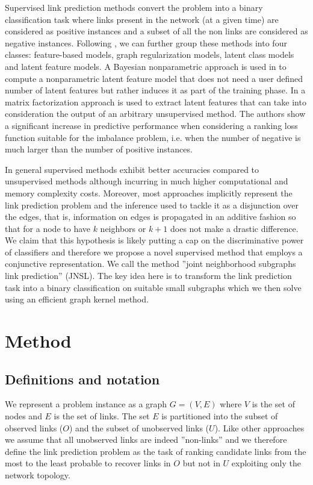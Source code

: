 \documentclass[runningheads,a4paper]{llncs}
\begin{document}
Supervised link prediction methods convert the problem into a binary classification task where links present in the network (at a given time) are considered as positive instances and a subset of all the non links are considered as negative instances. Following \cite{matrix-factorization}, we can further group these methods into four classes: feature-based models, graph regularization models, latent class models and latent feature models. 
A Bayesian nonparametric approach is used in \cite{nonparametric} to compute a nonparametric latent feature model that does not need a user defined number of latent features but rather induces it as part of the training phase. 
In \cite{matrix-factorization} a matrix factorization approach is used to extract latent features that can take into consideration the output of an arbitrary unsupervised method. The authors show a significant increase in predictive performance when considering a ranking loss function suitable for  the imbalance problem, i.e. when the number of negative is much larger than the number of positive instances. 

In general supervised methods exhibit better accuracies compared to unsupervised methods although incurring in much higher computational and memory complexity costs.
Moreover, most approaches implicitly represent the link prediction problem and the inference used to tackle it as a disjunction over the edges, that is, information on edges is propagated in an additive fashion so that for a node to have $k$ neighbors or $k+1$ does not make a drastic difference.
We claim that this hypothesis is likely putting a cap on the discriminative power of classifiers and therefore we propose a novel supervised method that employs a conjunctive representation. We call the method ''joint neighborhood subgraphs link prediction'' (JNSL). The key idea here is to transform the link prediction task into a binary classification on suitable small subgraphs which we then solve using an efficient graph kernel method.


\section{Method}

\subsection{Definitions and notation}
We represent a problem instance as a graph $G=(V,E)$ where $V$ is the set of nodes and $E$ is the set of links. The set $E$ is partitioned into the subset of observed links ($O$) and the subset of unobserved links ($U$). Like other approaches we assume that all unobserved links are indeed ''non-links'' and we therefore define the link prediction problem as the task of ranking candidate links from the most to the least probable to recover links in $O$ but not in $U$ exploiting only the network topology.
\end{document}
